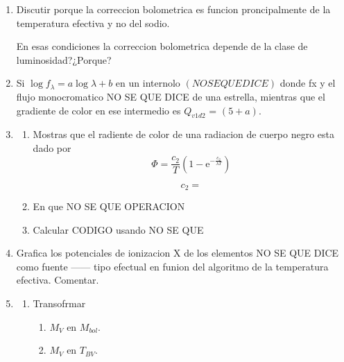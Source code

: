 \documentclass[12pt,spanish,a4paper]{practice}
\begin{document}
\begin{enumerate}[wide, labelwidth=!, labelindent=0pt, label=\textbf{\textrm{\arabic*)}}, ref=\arabic*]
    \item\label{prob:10} Discutir porque la correccion bolometrica es funcion proncipalmente de la temperatura efectiva y no del sodio.

        En esas condiciones la correccion bolometrica depende de la clase de luminosidad?¿Porque?

    \item\label{prob:11} Si $\log f_{\lambda} = a\log\lambda + b$ en un internolo $\left(NO SE QUE DICE\right)$ donde fx y el flujo monocromatico NO SE QUE DICE de una estrella, mientras que el gradiente de color en ese intermedio es $Q_{v1d2}$ = $\left(5+a\right)$.

    \item\label{prob:12}\hfill
        \begin{enumerate}
            \item\label{prob:12:a} Mostras que el radiente de color de una radiacion de cuerpo negro esta dado por
                $$
                    \Phi = \frac{c_2}{T}\left(1 - \mathrm{e}^{-\frac{c_2}{\lambda T}}\right)
                $$

                $$
                    c_2 =
                $$

            \item\label{prob:12:b} En que NO SE QUE OPERACION

            \item\label{prob:12:c} Calcular CODIGO usando NO SE QUE
       \end{enumerate}

    \item\label{prob:13} Grafica los potenciales de ionizacion X de los elementos NO SE QUE DICE como fuente ------ tipo efectual en funion del algoritmo de la temperatura efectiva. Comentar.

    \item\label{prob:14}\hfill
        \begin{enumerate}
            \item \label{prob:14:a} Transofrmar
                \begin{enumerate}
                    \item\label{prob:14:a:i} $M_{V}$ en $M_{bol}$.
                    \item\label{prob:14:a:ii} $M_{V}$ en $T_{BV}$.
                \end{enumerate}
        \end{enumerate}
    \end{enumerate}
\end{document}

